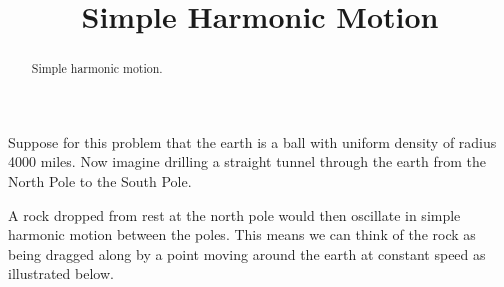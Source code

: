 \documentclass{ximera}
\title{Simple Harmonic Motion}
\begin{document}
\begin{abstract}
Simple harmonic motion.
\end{abstract}
\maketitle

Suppose for this problem that the earth is a ball with uniform density of radius 4000 miles. Now imagine drilling a straight tunnel through the earth from the North Pole to the South Pole. 

A rock dropped from rest at the north pole would then oscillate in simple harmonic motion between the poles. This means we can think of the rock as being dragged along by a point moving around the earth at constant speed as illustrated below.
\end{document}
